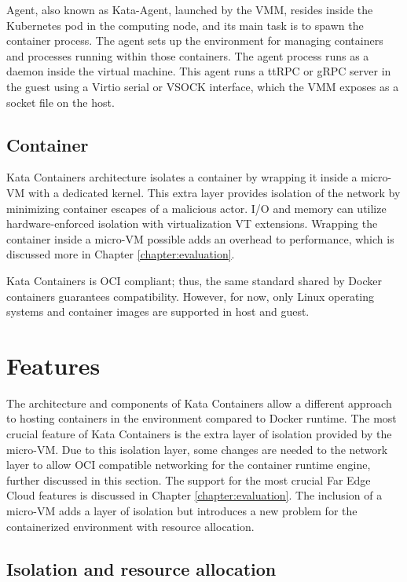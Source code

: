 Agent, also known as Kata-Agent, launched by the VMM, resides inside the Kubernetes pod in the computing node, and its main task is to spawn the container process. The agent sets up the environment for managing containers and processes running within those containers. The agent process runs as a daemon inside the virtual machine. This agent runs a ttRPC or gRPC server in the guest using a Virtio serial or VSOCK interface, which the VMM exposes as a socket file on the host. \cite{KataContainersArchitecture}

\subsection{Container}

Kata Containers architecture isolates a container by wrapping it inside a micro-VM with a dedicated kernel. This extra layer provides isolation of the network by minimizing container escapes of a malicious actor. I/O and memory can utilize hardware-enforced isolation with virtualization VT extensions. Wrapping the container inside a micro-VM possible adds an overhead to performance, which is discussed more in Chapter \ref{chapter:evaluation}. \cite{KataContainers}

Kata Containers is OCI compliant; thus, the same standard shared by Docker containers guarantees compatibility. However, for now, only Linux operating systems and container images are supported in host and guest.

\section{Features}

The architecture and components of Kata Containers allow a different approach to hosting containers in the environment compared to Docker runtime. The most crucial feature of Kata Containers is the extra layer of isolation provided by the micro-VM. Due to this isolation layer, some changes are needed to the network layer to allow OCI compatible networking for the container runtime engine, further discussed in this section. The support for the most crucial Far Edge Cloud features is discussed in Chapter \ref{chapter:evaluation}. The inclusion of a micro-VM adds a layer of isolation but introduces a new problem for the containerized environment with resource allocation.

\subsection{Isolation and resource allocation}

